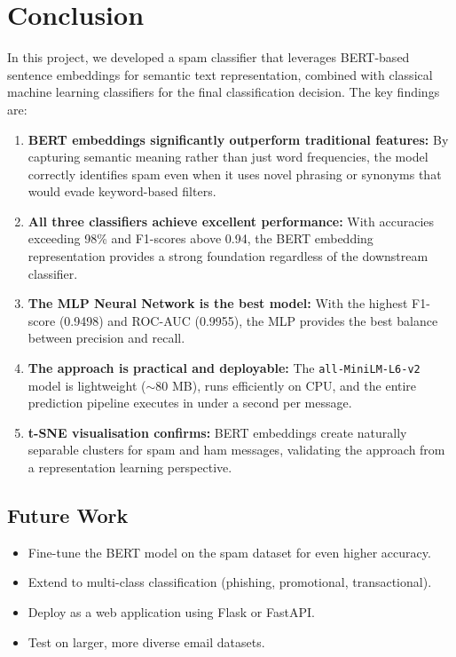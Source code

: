 \documentclass[12pt,a4paper]{article}
\begin{document}
\section{Conclusion}

In this project, we developed a spam classifier that leverages BERT-based sentence embeddings for semantic text representation, combined with classical machine learning classifiers for the final classification decision. The key findings are:

\begin{enumerate}
    \item \textbf{BERT embeddings significantly outperform traditional features:} By capturing semantic meaning rather than just word frequencies, the model correctly identifies spam even when it uses novel phrasing or synonyms that would evade keyword-based filters.

    \item \textbf{All three classifiers achieve excellent performance:} With accuracies exceeding 98\% and F1-scores above 0.94, the BERT embedding representation provides a strong foundation regardless of the downstream classifier.

    \item \textbf{The MLP Neural Network is the best model:} With the highest F1-score (0.9498) and ROC-AUC (0.9955), the MLP provides the best balance between precision and recall.

    \item \textbf{The approach is practical and deployable:} The \texttt{all-MiniLM-L6-v2} model is lightweight ($\sim$80 MB), runs efficiently on CPU, and the entire prediction pipeline executes in under a second per message.

    \item \textbf{t-SNE visualisation confirms:} BERT embeddings create naturally separable clusters for spam and ham messages, validating the approach from a representation learning perspective.
\end{enumerate}

\subsection{Future Work}
\begin{itemize}
    \item Fine-tune the BERT model on the spam dataset for even higher accuracy.
    \item Extend to multi-class classification (phishing, promotional, transactional).
    \item Deploy as a web application using Flask or FastAPI.
    \item Test on larger, more diverse email datasets.
\end{itemize}
\end{document}
